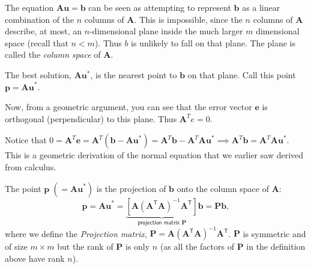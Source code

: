 The equation $\mathbf{Au} = \mathbf b$ can be seen as  attempting to represent $\mathbf b$   as a linear combination of the $n$ columns of $\mathbf A$.  This is impossible, since the $n$ columns of $\mathbf A$ describe, at most, an $n$-dimensional plane inside the much larger $m$ dimensional space (recall that $n < m$).  Thus $b$ is unlikely to fall on that plane.  The plane is called the {\em column space} of $\mathbf  A$.



The best solution, $\mathbf A\mathbf u^* $, is the nearest point to $\mathbf b$ on that plane. Call this point $\mathbf p = \mathbf {Au}^*$.

Now, from a geometric argument, you can see that the error vector $\mathbf e$ is orthogonal (perpendicular) to this plane.  Thus $\mathbf A^T e = 0$.

Notice that  $0 = \mathbf A^T \mathbf e = \mathbf A^T(\mathbf b-\mathbf {Au}^*) = \mathbf A^T\mathbf b - \mathbf A^T\mathbf {Au}^* \implies \mathbf A^T\mathbf b = \mathbf A^T\mathbf{Au}^*$.
This is a geometric derivation of  the normal equation that we earlier saw derived from calculus.  

The point  $\mathbf  p \; (= \mathbf {Au}^*)$ is the projection of $\mathbf b$ onto the column space of $\mathbf A$:
\[
\mathbf{p} = \mathbf{Au}^\ast = 
\underbrace{\left[\mathbf{A}\left(\mathbf{A}^\mathsf{T}\mathbf{A}\right)^{-1}\mathbf{A}^\mathsf{T}\right]}_{\textsf{projection matrix }\mathbf{P}}
\mathbf{b} = \mathbf{Pb},
\]
where we define the {\em Projection matrix}, $\mathbf{P} = \mathbf{A}\left(\mathbf{A}^\mathsf{T}\mathbf{A}\right)^{-1}\mathbf{A}^\mathsf{T}$.  $\mathbf P$ is symmetric and of size $m \times m$ but the rank of $\mathbf P$ is only $n$ (as all the factors of $\mathbf P$ in the definition above have rank $n$).


